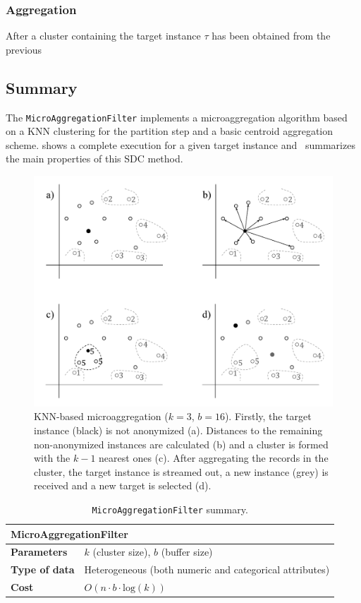 \subsubsection{Aggregation}

After a cluster containing the target instance $\tau$ has been obtained from the previous %

\subsection{Summary}
\label{Implementation:Microaggregation:Summary}

The \texttt{MicroAggregationFilter} implements a microaggregation algorithm based on a KNN clustering for the partition step and a basic centroid aggregation scheme.  shows a complete execution for a given target instance and~ summarizes the main properties of this SDC method.

\begin{figure}[h]
	\centering
	\includegraphics[width=.8\textwidth]{figures/microaggregation-schematic-2.pdf}
	\caption{KNN-based microaggregation ($k = 3$, $b = 16$). Firstly, the target instance (black) is not anonymized (a). Distances to the remaining non-anonymized instances are calculated (b) and a cluster is formed with the $k-1$ nearest ones (c). After aggregating the records in the cluster, the target instance is streamed out, a new instance (grey) is received and a new target is selected (d).}
	\label{fig:microaggregation-schematic-2}
\end{figure}

\begin{table}[h]
	\centering
	\begin{tabular}{@{}ll@{}}
	\toprule
	\multicolumn{2}{l}{\textbf{MicroAggregationFilter}}                             \\ \midrule
	\textbf{Parameters}   & $k$ (cluster size), $b$ (buffer size)                   \\
	\textbf{Type of data} & Heterogeneous (both numeric and categorical attributes) \\
	\textbf{Cost}         & $O(n \cdot b \cdot \mathrm{log}(k))$                    \\ \bottomrule
	\end{tabular}
	\caption{\texttt{MicroAggregationFilter} summary.}
	\label{table:microaggregation-summary}
\end{table}